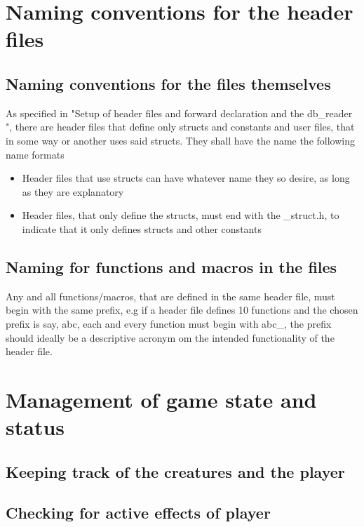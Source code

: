 \documentclass{report}
\begin{document}
\section*{Naming conventions for the header files}
\subsection*{Naming conventions for the files themselves}
As specified in "Setup of header files and forward declaration and the db\_reader ", there are header files that define only structs and constants and user files, that in some way or another uses said structs. They shall have the name the following name formats
\begin{itemize}
\item Header files that use structs can have whatever name they so desire, as long as they are explanatory
\item Header files, that only define the structs, must end with the \_struct.h, to indicate that it only defines structs and other constants
\end{itemize}
\subsection*{Naming for functions and macros in the files}
Any and all functions/macros, that are defined in the same header file, must begin with the same prefix, e.g if a header file defines 10 functions and the chosen prefix is say, abc, each and every function must begin with abc\_, the prefix should ideally be a descriptive acronym om the intended functionality of the header file.
\section*{Management of game state and status}
\subsection*{Keeping track of the creatures and the player}

\subsection*{Checking for active effects of player}
\end{document}
